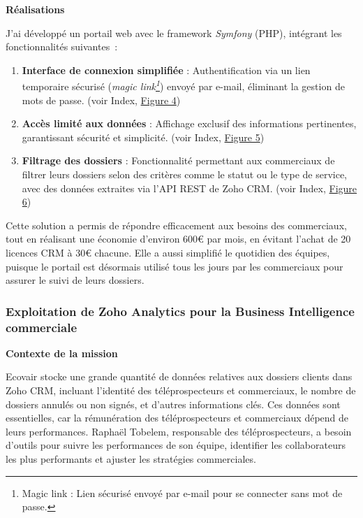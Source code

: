 \textbf{Réalisations}\vspace{0.3cm}

J’ai développé un portail web avec le framework \textit{Symfony} (PHP), intégrant les fonctionnalités suivantes~:\vspace{0.3cm}

\begin{enumerate}
    \item \textbf{Interface de connexion simplifiée} : Authentification via un lien temporaire sécurisé (\textit{magic link\footnote{Magic link : Lien sécurisé envoyé par e-mail pour se connecter sans mot de passe.}}) envoyé par e-mail, éliminant la gestion de mots de passe. (voir Index, \hyperref[fig:connexion-crm]{Figure 4})\vspace{0.3cm}
    \item \textbf{Accès limité aux données} : Affichage exclusif des informations pertinentes, garantissant sécurité et simplicité. (voir Index, \hyperref[fig:page-accueil]{Figure 5})\vspace{0.3cm}
    \item \textbf{Filtrage des dossiers} : Fonctionnalité permettant aux commerciaux de filtrer leurs dossiers selon des critères comme le statut ou le type de service, avec des données extraites via l’API REST de Zoho CRM. (voir Index, \hyperref[fig:filtrage]{Figure 6})\vspace{0.3cm}
\end{enumerate}

Cette solution a permis de répondre efficacement aux besoins des commerciaux, tout en réalisant une économie d’environ 600€ par mois, en évitant l’achat de 20 licences CRM à 30€ chacune. Elle a aussi simplifié le quotidien des équipes, puisque le portail est désormais utilisé tous les jours par les commerciaux pour assurer le suivi de leurs dossiers.


\subsubsection{Exploitation de Zoho Analytics pour la Business Intelligence commerciale}

\textbf{Contexte de la mission}\vspace{0.3cm}

Ecovair stocke une grande quantité de données relatives aux dossiers clients dans Zoho CRM, incluant l’identité des téléprospecteurs et commerciaux, le nombre de dossiers annulés ou non signés, et d’autres informations clés. Ces données sont essentielles, car la rémunération des téléprospecteurs et commerciaux dépend de leurs performances. Raphaël Tobelem, responsable des téléprospecteurs, a besoin d’outils pour suivre les performances de son équipe, identifier les collaborateurs les plus performants et ajuster les stratégies commerciales.

